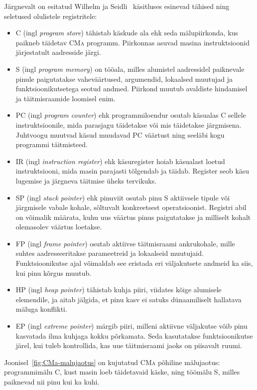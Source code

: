 Järgnevalt on esitatud Wilhelm ja Seidli~\cite{wilhelm_imperative_2010} käsitluses esinevad tähised ning seletused olulistele registritele:

\begin{itemize}
	\item C (ingl \emph{program store}) tähistab käskude ala ehk seda mälupiirkonda, kus paikneb täidetav \textsc{CMa} programm. Piirkonnas asuvad masina instruktsioonid järjestatult aadresside järgi.
	\item S (ingl \emph{program memory}) on tööala, milles alumistel aadressidel paiknevale pinule paigutatakse vaheväärtused, argumendid, lokaalsed muutujad ja funktsioonikutsetega seotud andmed. Piirkond muutub avaldiste hindamisel ja täitmisraamide loomisel enim.
	\item PC (ingl \emph{program counter}) ehk programmiloendur osutab käsualas C sellele instruktsioonile, mida parasjagu täidetakse või mis täidetakse järgmisena. Juhtvoogu muutvad käsud muudavad PC väärtust ning seeläbi kogu programmi täitmisteed.
	\item IR (ingl \emph{instruction register}) ehk käsuregister hoiab käsualast loetud instruktsiooni, mida masin parajasti tõlgendab ja täidab. Register seob käsu lugemise ja järgneva täitmise üheks tervikuks.
	\item SP (ingl \emph{stack pointer}) ehk pinuviit osutab pinu S aktiivsele tipule või järgmisele vabale kohale, sõltuvalt konkreetsest operatsioonist. Registri abil on võimalik määrata, kuhu uus väärtus pinus paigutatakse ja milliselt kohalt olemasolev väärtus loetakse.
	\item FP (ingl \emph{frame pointer}) osutab aktiivse täitmisraami ankrukohale, mille suhtes aadresseeritakse parameetreid ja lokaalseid muutujaid. Funktsioonikutse ajal võimaldab see eristada eri väljakutsete andmeid ka siis, kui pinu kõrgus muutub.
	\item HP (ingl \emph{heap pointer}) tähistab kuhja piiri, viidates kõige alumisele elemendile, ja aitab jälgida, et pinu kasv ei satuks dünaamiliselt hallatava mäluga konflikti.
	\item EP (ingl \emph{extreme pointer}) märgib piiri, milleni aktiivne väljakutse võib pinu kasvatada ilma kuhjaga kokku põrkamata. Seda kasutatakse funktsioonikutse järel, kui tuleb kontrollida, kas uue täitmisraami jaoks on piisavalt ruumi.
\end{itemize}

Joonisel~\ref{fig:CMa-malujaotus} on kujutatud \textsc{CMa} põhiline mälujaotus: programmimälu C, kust masin loeb täidetavaid käske, ning töömälu S, milles paiknevad nii pinu kui ka kuhi.

